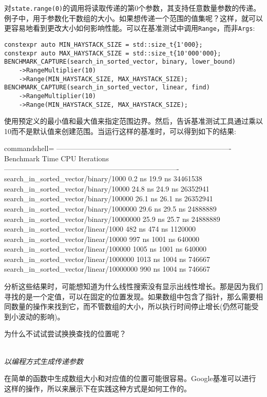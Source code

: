 对\texttt{state.range(0)}的调用将读取传递的第0个参数，其支持任意数量参数的传递。例子中，用于参数化干数组的大小。如果想传递一个范围的值集呢？这样，就可以更容易地看到更改大小如何影响性能。可以在基准测试中调用\texttt{Range}，而非\texttt{Args}:

\begin{lstlisting}[style=styleCXX]
constexpr auto MIN_HAYSTACK_SIZE = std::size_t{1'000};
constexpr auto MAX_HAYSTACK_SIZE = std::size_t{10'000'000};
BENCHMARK_CAPTURE(search_in_sorted_vector, binary, lower_bound)
	->RangeMultiplier(10)
	->Range(MIN_HAYSTACK_SIZE, MAX_HAYSTACK_SIZE);
BENCHMARK_CAPTURE(search_in_sorted_vector, linear, find)
	->RangeMultiplier(10)
	->Range(MIN_HAYSTACK_SIZE, MAX_HAYSTACK_SIZE);
\end{lstlisting}

使用预定义的最小值和最大值来指定范围边界。然后，告诉基准测试工具通过乘以10而不是默认值来创建范围。当运行这样的基准时，可以得到如下的结果:

\begin{tcblisting}{commandshell={}}
-------------------------------------------------------------------------
Benchmark Time CPU Iterations
-------------------------------------------------------------------------
search_in_sorted_vector/binary/1000 0.2 ns 19.9 ns 34461538
search_in_sorted_vector/binary/10000 24.8 ns 24.9 ns 26352941
search_in_sorted_vector/binary/100000 26.1 ns 26.1 ns 26352941
search_in_sorted_vector/binary/1000000 29.6 ns 29.5 ns 24888889
search_in_sorted_vector/binary/10000000 25.9 ns 25.7 ns 24888889
search_in_sorted_vector/linear/1000 482 ns 474 ns 1120000
search_in_sorted_vector/linear/10000 997 ns 1001 ns 640000
search_in_sorted_vector/linear/100000 1005 ns 1001 ns 640000
search_in_sorted_vector/linear/1000000 1013 ns 1004 ns 746667
search_in_sorted_vector/linear/10000000 990 ns 1004 ns 746667
\end{tcblisting}

分析这些结果时，可能想知道为什么线性搜索没有显示出线性增长。那是因为我们寻找的是一个定值，可以在固定的位置发现。如果数组中包含了指针，那么需要相同数量的操作来找到它，而不管数组的大小，所以执行时间停止增长(仍然可能受到小波动的影响)。

为什么不试试尝试换换查找的位置呢？

\hspace*{\fill} \\ %
\noindent
\textit{以编程方式生成传递参数}

在简单的函数中生成数组大小和对应值的位置可能很容易。Google基准可以进行这样的操作，所以来展示下在实践这种方式是如何工作的。

